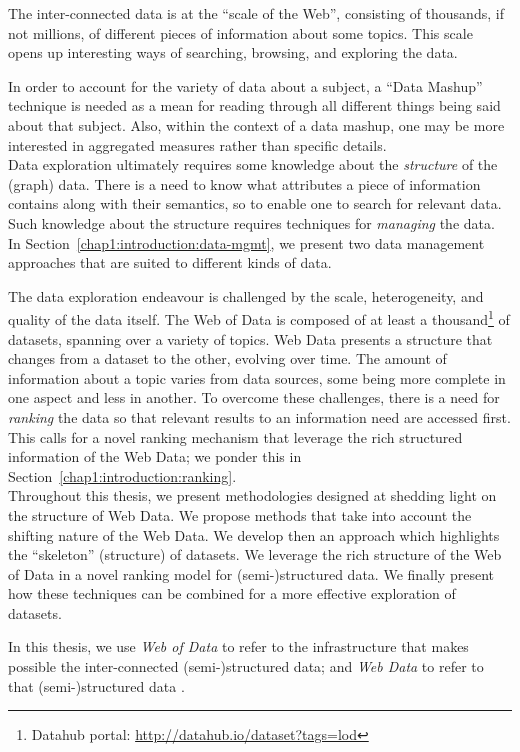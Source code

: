 The inter-connected data is at the ``scale of the Web'', consisting of thousands, if not millions, of different pieces of information about some topics. This scale opens up interesting ways of searching, browsing, and exploring the data.

In order to account for the variety of data about a subject, a ``Data Mashup'' technique is needed as a mean for reading through all different things being said about that subject. Also, within the context of a data mashup, one may be more interested in aggregated measures rather than specific details.\\

Data exploration ultimately requires some knowledge about the \emph{structure} of the (graph) data. There is a need to know what attributes a piece of information contains along with their semantics, so to enable one to search for relevant data. Such knowledge about the structure requires techniques for \emph{managing} the data. In Section~\ref{chap1:introduction:data-mgmt}, we present two data management approaches that are suited to different kinds of data.

The data exploration endeavour is challenged by the scale, heterogeneity, and quality of the data itself. The Web of Data is composed of at least a thousand\footnote{Datahub portal: \url{http://datahub.io/dataset?tags=lod}} of datasets, spanning over a variety of topics. Web Data presents a structure that changes from a dataset to the other, evolving over time. The amount of information about a topic varies from data sources, some being more complete in one aspect and less in another. To overcome these challenges, there is a need for \emph{ranking} the data so that relevant results to an information need are accessed first. This calls for a novel ranking mechanism that leverage the rich structured information of the Web Data; we ponder this in Section~\ref{chap1:introduction:ranking}.\\

Throughout this thesis, we present methodologies designed at shedding light on the structure of Web Data. We propose methods that take into account the shifting nature of the Web Data. We develop then an approach which highlights the ``skeleton'' (structure) of datasets. We leverage the rich structure of the Web of Data in a novel ranking model for (semi-)structured data. We finally present how these techniques can be combined for a more effective exploration of datasets.

In this thesis, we use \emph{Web of Data} to refer to the infrastructure that makes possible the inter-connected (semi-)structured data; and \emph{Web Data} to refer to that (semi-)structured data \cite{delbru:jws:entity}.

